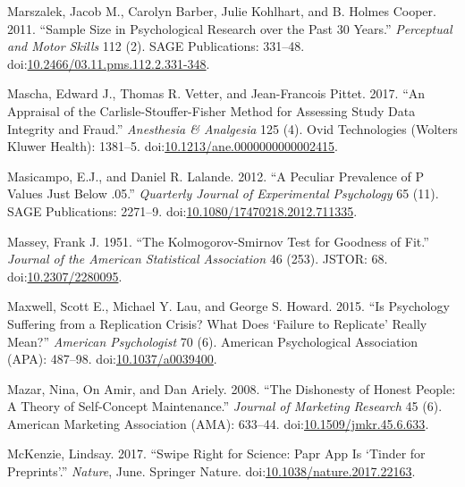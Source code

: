 \documentclass[a5paper]{book}
\begin{document}
\hypertarget{ref-doi:10.2466ux2f03.11.pms.112.2.331-348}{}
Marszalek, Jacob M., Carolyn Barber, Julie Kohlhart, and B. Holmes
Cooper. 2011. ``Sample Size in Psychological Research over the Past 30
Years.'' \emph{Perceptual and Motor Skills} 112 (2). SAGE Publications:
331--48.
doi:\href{https://doi.org/10.2466/03.11.pms.112.2.331-348}{10.2466/03.11.pms.112.2.331-348}.

\hypertarget{ref-doi:10.1213ux2fane.0000000000002415}{}
Mascha, Edward J., Thomas R. Vetter, and Jean-Francois Pittet. 2017.
``An Appraisal of the Carlisle-Stouffer-Fisher Method for Assessing
Study Data Integrity and Fraud.'' \emph{Anesthesia \& Analgesia} 125
(4). Ovid Technologies (Wolters Kluwer Health): 1381--5.
doi:\href{https://doi.org/10.1213/ane.0000000000002415}{10.1213/ane.0000000000002415}.

\hypertarget{ref-doi:10.1080ux2f17470218.2012.711335}{}
Masicampo, E.J., and Daniel R. Lalande. 2012. ``A Peculiar Prevalence of
P Values Just Below .05.'' \emph{Quarterly Journal of Experimental
Psychology} 65 (11). SAGE Publications: 2271--9.
doi:\href{https://doi.org/10.1080/17470218.2012.711335}{10.1080/17470218.2012.711335}.

\hypertarget{ref-doi:10.2307ux2f2280095}{}
Massey, Frank J. 1951. ``The Kolmogorov-Smirnov Test for Goodness of
Fit.'' \emph{Journal of the American Statistical Association} 46 (253).
JSTOR: 68. doi:\href{https://doi.org/10.2307/2280095}{10.2307/2280095}.

\hypertarget{ref-doi:10.1037ux2fa0039400}{}
Maxwell, Scott E., Michael Y. Lau, and George S. Howard. 2015. ``Is
Psychology Suffering from a Replication Crisis? What Does `Failure to
Replicate' Really Mean?'' \emph{American Psychologist} 70 (6). American
Psychological Association (APA): 487--98.
doi:\href{https://doi.org/10.1037/a0039400}{10.1037/a0039400}.

\hypertarget{ref-doi:10.1509ux2fjmkr.45.6.633}{}
Mazar, Nina, On Amir, and Dan Ariely. 2008. ``The Dishonesty of Honest
People: A Theory of Self-Concept Maintenance.'' \emph{Journal of
Marketing Research} 45 (6). American Marketing Association (AMA):
633--44.
doi:\href{https://doi.org/10.1509/jmkr.45.6.633}{10.1509/jmkr.45.6.633}.

\hypertarget{ref-doi:10.1038ux2fnature.2017.22163}{}
McKenzie, Lindsay. 2017. ``Swipe Right for Science: Papr App Is `Tinder
for Preprints'.'' \emph{Nature}, June. Springer Nature.
doi:\href{https://doi.org/10.1038/nature.2017.22163}{10.1038/nature.2017.22163}.
\end{document}
